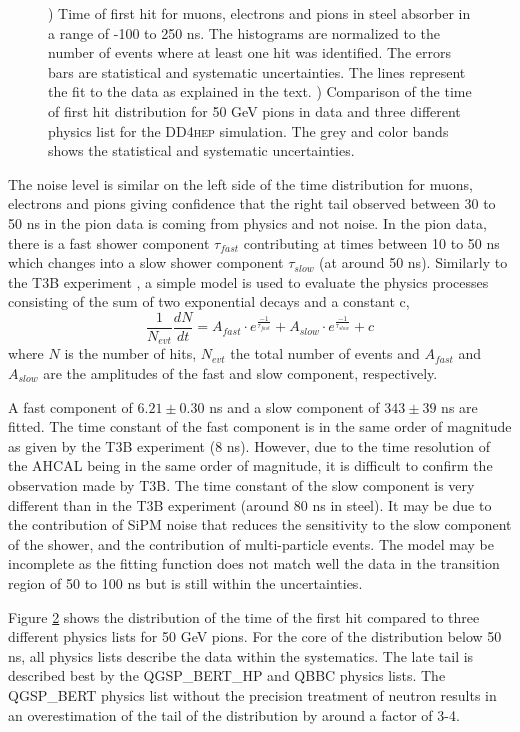 \documentclass{JINST}
\newcommand\ddhep{\textsc{DD4hep}\xspace}
\begin{document}
\begin{figure}[htbp!]
\begin{subfigure}[t]{0.49\textwidth}
    \caption{}\label{fig:dNdt_SimData_50GeV_DD4hep}
  \end{subfigure}
  \caption{) Time of first hit for muons, electrons and pions in steel absorber in a range of -100 to 250 ns. The histograms are normalized to the number of events where at least one hit was identified. The errors bars are statistical and systematic uncertainties. The lines represent the fit to the data as explained in the text. ) Comparison of the time of first hit distribution for 50 GeV pions in data and three different physics list for the \ddhep simulation. The grey and color bands shows the statistical and systematic uncertainties.}
\end{figure}

The noise level is similar on the left side of the time distribution for muons, electrons and pions giving confidence that the right tail observed between 30 to 50 ns in the pion data is coming from physics and not noise. In the pion data, there is a fast shower component $\tau_{fast}$ contributing at times between 10 to 50 ns which changes into a slow shower component $\tau_{slow}$ (at around 50 ns). Similarly to the T3B experiment \cite{Simon2013}, a simple model is used to evaluate the physics processes consisting of the sum of two exponential decays and a constant c,
$$
\frac{1}{N_{evt}}\frac{dN}{dt} = A_{fast} \cdot e^{\frac{-1}{\tau_{fast}}} + A_{slow} \cdot e^{\frac{-1}{\tau_{slow}}} + c
$$
where $N$ is the number of hits, $N_{evt}$ the total number of events and $A_{fast}$ and $A_{slow}$ are the amplitudes of the fast and slow component, respectively.

A fast component of $6.21 \pm 0.30$ ns and a slow component of $343 \pm 39$ ns are fitted. The time constant of the fast component is in the same order of magnitude as given by the T3B experiment (8 ns). However, due to the time resolution of the AHCAL being in the same order of magnitude, it is difficult to confirm the observation made by T3B. The time constant of the slow component is very different than in the T3B experiment (around 80 ns in steel). It may be due to the contribution of SiPM noise that reduces the sensitivity to the slow component of the shower, and the contribution of multi-particle events. The model may be incomplete as the fitting function does not match well the data in the transition region of 50 to 100 ns but is still within the uncertainties.

Figure \ref{fig:dNdt_SimData_50GeV_DD4hep} shows the distribution of the time of the first hit compared to three different physics lists for 50 GeV pions. For the core of the distribution below 50 ns, all physics lists describe the data within the systematics. The late tail is described best by the QGSP\_BERT\_HP and QBBC physics lists. The QGSP\_BERT physics list without the precision treatment of neutron results in an overestimation of the tail of the distribution by around a factor of 3-4.
\end{document}
